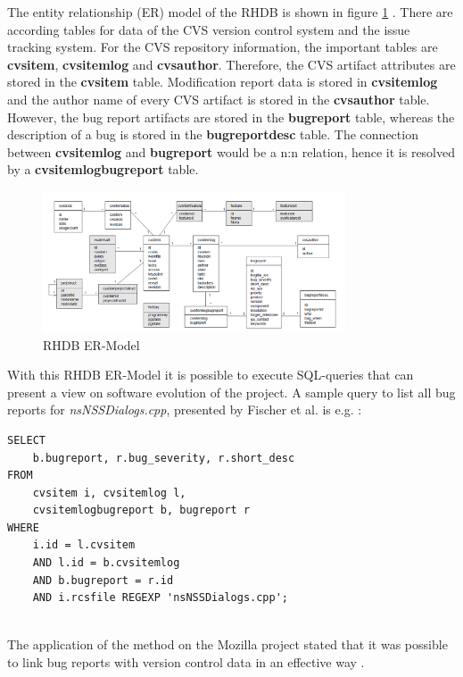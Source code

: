 The entity relationship (ER) model of the RHDB is shown in figure \ref{fig:rhdber} \cite{fischer2003populating}. There are according tables for data of the CVS version control system and the issue tracking system. For the CVS repository information, the important tables are \textbf{cvsitem}, \textbf{cvsitemlog} and \textbf{cvsauthor}. Therefore, the CVS artifact attributes are stored in the \textbf{cvsitem} table. Modification report data is stored in \textbf{cvsitemlog} and the author name of every CVS artifact is stored in the \textbf{cvsauthor} table. However, the bug report artifacts are stored in the \textbf{bugreport} table, whereas the description of a bug is stored in the \textbf{bugreportdesc} table. The connection between \textbf{cvsitemlog} and \textbf{bugreport} would be a n:n relation, hence it is resolved by a \textbf{cvsitemlogbugreport} table.\\

\begin{figure}[t]
	\centering
	\includegraphics[width=0.8\textwidth]{images/rhdb_er}
	\caption{RHDB ER-Model \cite{fischer2003populating}}
	\label{fig:rhdber}
\end{figure}

With this RHDB ER-Model it is possible to execute SQL-queries that can present a view on software evolution of the project. A sample query to list all bug reports for \textit{nsNSSDialogs.cpp}, presented by Fischer et al. is e.g. \cite{fischer2003populating}:

\begin{verbatim}
SELECT
	b.bugreport, r.bug_severity, r.short_desc
FROM
	cvsitem i, cvsitemlog l,
	cvsitemlogbugreport b, bugreport r
WHERE 	
	i.id = l.cvsitem
	AND l.id = b.cvsitemlog
	AND b.bugreport = r.id
	AND i.rcsfile REGEXP 'nsNSSDialogs.cpp';
	
\end{verbatim}

The application of the method on the Mozilla project stated that it was possible to link bug reports with version control data in an effective way \cite{fischer2003populating}. 

